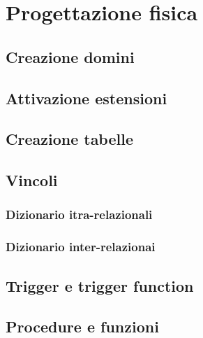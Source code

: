 \section{Progettazione fisica}
\subsection{Creazione domini}

\subsection{Attivazione estensioni}

\subsection{Creazione tabelle}

\subsection{Vincoli}
\subsubsection{Dizionario itra-relazionali}
\subsubsection{Dizionario inter-relazionai}

\subsection{Trigger e trigger function}

\subsection{Procedure e funzioni}
